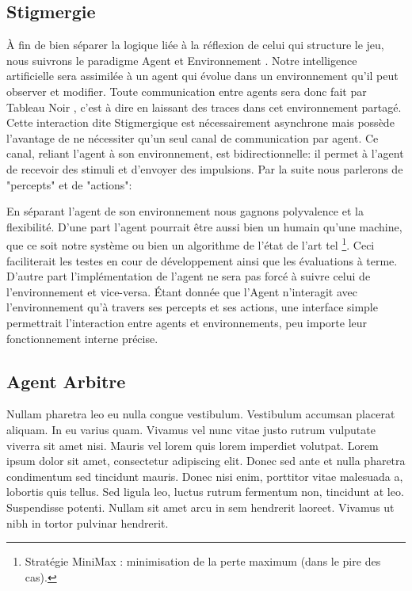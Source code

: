 \subsection{ \og Stigmergie \fg{} }

À fin de bien séparer la logique liée à la réflexion de celui qui structure le jeu, nous suivrons le paradigme \og Agent et Environnement \fg{}. Notre intelligence artificielle sera assimilée à un agent qui évolue dans un environnement qu'il peut observer et modifier. 
Toute communication entre agents sera donc fait par \og Tableau Noir \fg{}, c'est à dire en laissant des traces dans cet environnement partagé. Cette interaction dite \og Stigmergique \fg{} est nécessairement asynchrone mais possède l'avantage de ne nécessiter qu'un seul canal de communication par agent.
Ce canal, reliant l'agent à son environnement, est bidirectionnelle: il permet à l'agent de recevoir des stimuli et d'envoyer des impulsions. Par la suite nous parlerons de "percepts" et de "actions":


En séparant l'agent de son environnement nous gagnons polyvalence et la flexibilité. D'une part l'agent pourrait être aussi bien un humain qu'une machine, que ce soit notre système ou bien un algorithme de l'état de l'art tel \footnote{Stratégie MiniMax : minimisation de la perte maximum (dans le pire des cas).}. Ceci faciliterait les testes en cour de développement ainsi que les évaluations à terme.
D'autre part l'implémentation de l'agent ne sera pas forcé à suivre celui de l'environnement et vice-versa. Étant donnée que l'Agent n'interagit avec l'environnement qu'à travers ses percepts et ses actions, une interface simple permettrait l'interaction entre agents et environnements, peu importe leur fonctionnement interne précise.

\subsection{ Agent \og Arbitre \fg{} }

Nullam pharetra leo eu nulla congue vestibulum. Vestibulum accumsan placerat aliquam. In eu varius quam. Vivamus vel nunc vitae justo rutrum vulputate viverra sit amet nisi. Mauris vel lorem quis lorem imperdiet volutpat. Lorem ipsum dolor sit amet, consectetur adipiscing elit. Donec sed ante et nulla pharetra condimentum sed tincidunt mauris. Donec nisi enim, porttitor vitae malesuada a, lobortis quis tellus. Sed ligula leo, luctus rutrum fermentum non, tincidunt at leo. Suspendisse potenti. Nullam sit amet arcu in sem hendrerit laoreet. Vivamus ut nibh in tortor pulvinar hendrerit. 
